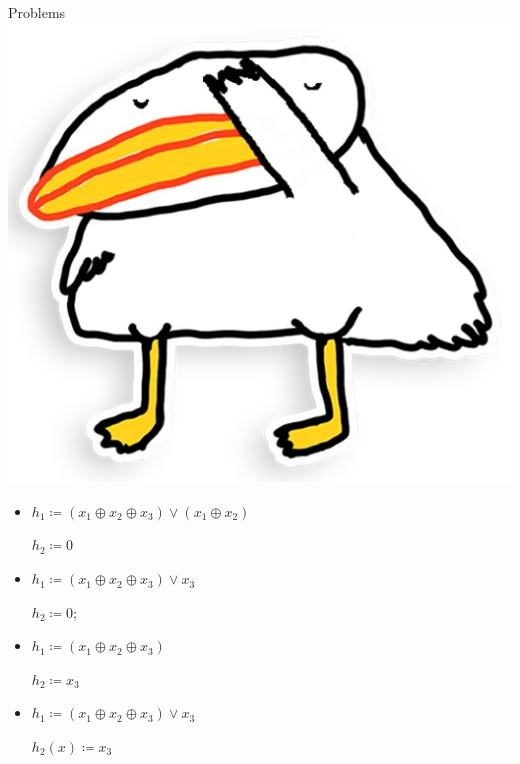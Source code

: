 \begin{frame}{Problems \hspace{0.1cm} \includegraphics[scale = 0.03]{pics/utia-shame.png}}
    \pause
    \vspace{0.2cm}
    \begin{minipage}{0.48\linewidth}
        \begin{itemize}
            \item $h_1 \coloneqq (x_1 \oplus x_2 \oplus x_3) \lor (x_1 \oplus x_2)$
                
                  $h_2 \coloneqq 0$
        \end{itemize}
    \end{minipage}
    \pause
    \begin{minipage}{0.48\linewidth}
        \begin{itemize}
            \item $h_1 \coloneqq (x_1 \oplus x_2 \oplus x_3) \lor x_3$

                $h_2 \coloneqq 0$;
                \pause
            \item $h_1 \coloneqq (x_1 \oplus x_2 \oplus x_3)$

                $h_2 \coloneqq x_3$
                \pause
            \item $h_1 \coloneqq (x_1 \oplus x_2 \oplus x_3) \lor x_3$

                $h_2(x) \coloneqq x_3$
        \end{itemize}
    \end{minipage}

\end{frame}


